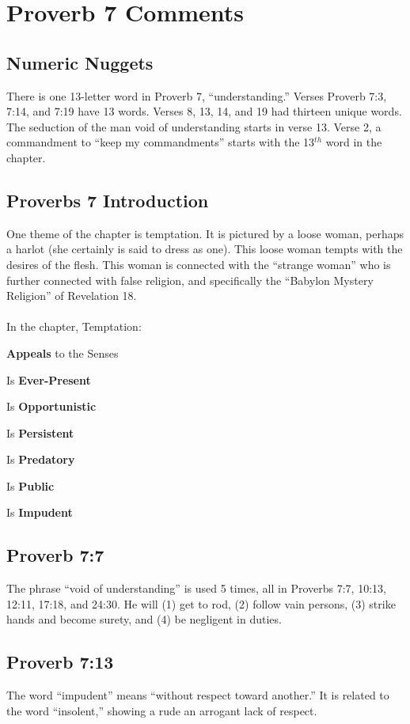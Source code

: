 \section{Proverb 7 Comments}

\subsection{Numeric Nuggets}
There is one 13-letter word in Proverb 7, ``understanding.'' Verses Proverb 7:3, 7:14, and 7:19 have 13 words. Verses 8, 13, 14, and 19 had thirteen unique words. The seduction of the man void of understanding starts in verse 13. Verse 2, a commandment to ``keep my commandments'' starts with the 13$^{th}$ word in the chapter.

\subsection{Proverbs 7 Introduction}
One theme of the chapter is temptation. It is pictured by a loose woman, perhaps a harlot (she certainly is said to dress as one). This loose woman tempts with the desires of the flesh. This woman is connected with the ``strange woman'' who is further connected with false religion, and specifically the ``Babylon Mystery Religion'' of Revelation 18.\\
\\
\noindent In the chapter, Temptation:
\begin{compactenum}
    \item \textbf{Appeals} to the Senses
    \item Is \textbf{Ever-Present}
    \item Is \textbf{Opportunistic}
    \item Is \textbf{Persistent}
    \item Is \textbf{Predatory}
    \item Is \textbf{Public}
    \item Is \textbf{Impudent}
\end{compactenum}

\subsection{Proverb 7:7}
The phrase ``void of understanding'' is used 5 times, all in Proverbs 7:7, 10:13, 12:11, 17:18, and 24:30. He will (1) get to rod, (2) follow vain persons, (3) strike hands and become surety, and (4) be negligent in duties.

\subsection{Proverb 7:13}
The word ``impudent'' means ``without respect toward another.''  It is related to the word ``insolent,'' showing a rude an arrogant lack of respect.

